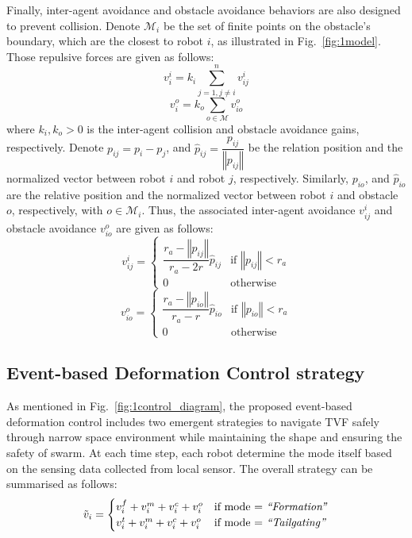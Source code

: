 Finally, inter-agent avoidance and obstacle avoidance behaviors are also designed to prevent collision. Denote $\mathcal{M}_i$ be the set of finite points on the obstacle's boundary, which are the closest to robot $i$, as illustrated in Fig.~\ref{fig:1model}. Those repulsive forces are given as follows:
\begin{equation}
    v_i^i=k_{i}\sum_{j=1,j\neq i}^n{v_{ij}^i}
\end{equation}
\begin{equation}
    v_i^o=k_o\sum_{o\in\mathcal{M}}v_{io}^o
\end{equation}
where $k_i,k_o>0$ is the inter-agent collision and obstacle avoidance gains, respectively. Denote $p_{ij}=p_i-p_j$, and $\hat{p}_{ij}=\dfrac{p_{ij}}{\left\Vert p_{ij}\right\Vert}$ be the relation position and the normalized vector between robot $i$ and robot $j$, respectively. Similarly, $p_{io}$, and $\hat{p}_{io}$ are the relative position and the normalized vector between robot $i$ and obstacle $o$, respectively, with $o\in\mathcal{M}_i$. Thus, the associated inter-agent avoidance $v_{ij}^i$ and obstacle avoidance $v_{io}^o$ are given as follows:
\begin{equation}
    v_{ij}^{i}=\begin{cases}
    \dfrac{r_a-\left\Vert p_{ij}\right\Vert}{r_a -2r}\hat{p}_{ij} & \text{if }\left\Vert p_{ij}\right\Vert<r_{a} \\
    0 & \text{otherwise}
    \end{cases}
    \label{eqn:1ui}
\end{equation}
\begin{equation}
    v_{io}^{o}=\begin{cases}
    \dfrac{r_a-\left\Vert p_{io}\right\Vert}{r_a -r}\hat{p}_{io} & \text{if }\left\Vert p_{io}\right\Vert<r_{a} \\
    0 & \text{otherwise}
    \end{cases}
    \label{eqn:1uo}
\end{equation}

\subsection{Event-based Deformation Control strategy}\label{sec:edc}

As mentioned in Fig.~\ref{fig:1control_diagram}, the proposed event-based deformation control includes two emergent strategies to navigate TVF safely through narrow space environment while maintaining the shape and ensuring the safety of swarm. At each time step, each robot determine the mode itself based on the sensing data collected from local sensor. The overall strategy can be summarised as follows:
\begin{equation}
    \tilde{v}_i=\begin{cases}
        v_i^f+v_i^m+v_i^c+v_i^o & \text{if mode = \textit{``Formation''}}\\
        v_i^t+v_i^m+v_i^c+v_i^o & \text{if mode = \textit{``Tailgating''}}
    \end{cases}
    \label{eqn:1v}
\end{equation}

